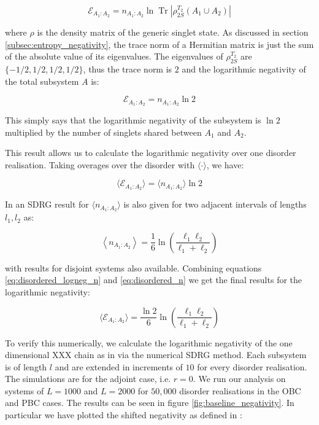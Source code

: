 \begin{equation}
\mathcal{E}_{A_1: A_2}=n_{A_1: A_2} \ln \operatorname{Tr}\left|\rho^{T_2}_{2S}\left(A_1 \cup A_2\right)\right|
\end{equation}

where $\rho$ is the density matrix of the generic singlet state. As discussed in section \ref{subsec:entropy_negativity}, the trace norm of a Hermitian matrix is just the sum of the absolute value of its eigenvalues. The eigenvalues of $\rho^{T_2}_{2S}$ are $\{-1/2, 1/2, 1/2, 1/2\}$, thus the trace norm is $2$ and the logarithmic negativity of the total subsystem $A$ is:

\begin{equation}
\mathcal{E}_{A_1: A_2}=n_{A_1: A_2} \ln 2
\end{equation}

This simply says that the logarithmic negativity of the subsystem is $\ln{2}$ multiplied by the number of singlets shared between $A_1$ and $A_2$.

This result allows us to calculate the logarithmic negativity over one disorder realisation. Taking overages over the disorder with $\langle \cdot \rangle$, we have:

\begin{equation}\label{eq:disordered_logneg_n}
	\langle \mathcal{E}_{A_1: A_2} \rangle = \langle n_{A_1: A_2} \rangle \ln 2
\end{equation}

In \cite{paola2016} an SDRG result for $\langle n_{A_1: A_2} \rangle$ is also given for two adjacent intervals of lengths $l_1, l_2$ as:

\begin{equation}\label{eq:disordered_n}
\left\langle n_{A_1: A_2}\right\rangle=\frac{1}{6} \ln \left(\frac{\ell_1 \ell_2}{\ell_1+\ell_2}\right)
\end{equation}

with results for disjoint systems also available. Combining equations \ref{eq:disordered_logneg_n} and \ref{eq:disordered_n} we get the final results for the logarithmic negativity: 

\begin{equation}\label{eq:disordered_logneg}
	\langle \mathcal{E}_{A_1: A_2} \rangle = \frac{\ln 2}{6} \ln \left(\frac{\ell_1 \ell_2}{\ell_1+\ell_2}\right)
\end{equation}


To verify this numerically, we calculate the logarithmic negativity of the one dimensional XXX chain as in \cite{paola2016} via the numerical SDRG method. Each subsystem is of length $l$ and are extended in increments of $10$ for every disorder realisation. The simulations are for the adjoint case, i.e. $r = 0$. We run our analysis on systems of $L = 1000$ and $L = 2000$ for $50, 000$ disorder realisations in the OBC and PBC cases. The results can be seen in figure \ref{fig:baseline_negativity}. In particular we have plotted the shifted negativity as defined in \cite{paola2016}:

